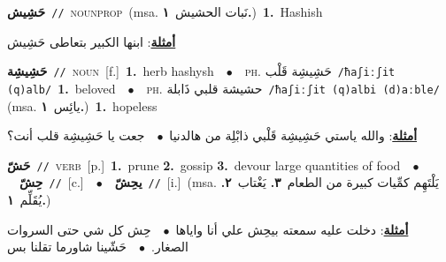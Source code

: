 \documentclass[10pt,a4paper,twoside]{article} %
\begin{document}
\begin{multicols}{2}
{\setlength\topsep{0pt}\textbf{\foreignlanguage{arabic}{حَشِيش}}\ {\color{gray}\texttt{//}\color{black}}\ \textsc{noun\textunderscore prop}\ \color{gray}(msa. \foreignlanguage{arabic}{نَبات الحشيش}~\foreignlanguage{arabic}{\textbf{١.}})\color{black}\ \textbf{1.}~Hashish\  \begin{flushright}\color{gray}\foreignlanguage{arabic}{\textbf{\underline{\foreignlanguage{arabic}{أمثلة}}}: ابنها الكبير بتعاطى حَشِيش}\end{flushright}\color{black}} \vspace{2mm}

{\setlength\topsep{0pt}\textbf{\foreignlanguage{arabic}{حَشِيشِة}}\ {\color{gray}\texttt{//}\color{black}}\ \textsc{noun}\ [f.]\ \textbf{1.}~herb hashysh\ \ $\bullet$\ \ \textsc{ph.} \color{gray} \foreignlanguage{arabic}{حَشِيشِة قَلْب}\color{black}\ {\color{gray}\texttt{/{\sffamily ħaʃiːʃit (q)alb}/}\color{black}}\ \textbf{1.}~beloved\ \ $\bullet$\ \ \textsc{ph.} \color{gray} \foreignlanguage{arabic}{حشيشة قلبي ذَابلة}\color{black}\ {\color{gray}\texttt{/{\sffamily ħaʃiːʃit (q)albi (d)aːble}/}\color{black}}\ \color{gray} (msa. \foreignlanguage{arabic}{يائِس}~\foreignlanguage{arabic}{\textbf{١.}})\color{black}\ \textbf{1.}~hopeless\  \begin{flushright}\color{gray}\foreignlanguage{arabic}{\textbf{\underline{\foreignlanguage{arabic}{أمثلة}}}: والله ياستي حَشِيشِة قَلْبي ذابْلِة من هالدنيا\ $\bullet$\ \  جعت يا حَشِيشِة قلب أنت؟}\end{flushright}\color{black}} \vspace{2mm}

{\setlength\topsep{0pt}\textbf{\foreignlanguage{arabic}{حَشّ}}\ {\color{gray}\texttt{//}\color{black}}\ \textsc{verb}\ [p.]\ \textbf{1.}~prune  \textbf{2.}~gossip  \textbf{3.}~devour large quantities of food\ \ $\bullet$\ \ \setlength\topsep{0pt}\textbf{\foreignlanguage{arabic}{حِشّ}}\ {\color{gray}\texttt{//}\color{black}}\ [c.]\ \ $\bullet$\ \ \setlength\topsep{0pt}\textbf{\foreignlanguage{arabic}{يحِشّ}}\ {\color{gray}\texttt{//}\color{black}}\ [i.]\ \color{gray}(msa. \foreignlanguage{arabic}{يَلْتَهِم كمِّيات كبيرة من الطعام}~\foreignlanguage{arabic}{\textbf{٣.}}  \foreignlanguage{arabic}{يَغْتاب}~\foreignlanguage{arabic}{\textbf{٢.}}  \foreignlanguage{arabic}{يُقَلِّم}~\foreignlanguage{arabic}{\textbf{١.}})\color{black}\  \begin{flushright}\color{gray}\foreignlanguage{arabic}{\textbf{\underline{\foreignlanguage{arabic}{أمثلة}}}: دخلت عليه سمعته بيحِش علي أنا واياها\ $\bullet$\ \  حِش كل شي حتى السروات الصغار.\ $\bullet$\ \  حَشّينا شاورما تقلنا بس}\end{flushright}\color{black}} \vspace{2mm}


\end{multicols}
\end{document}
